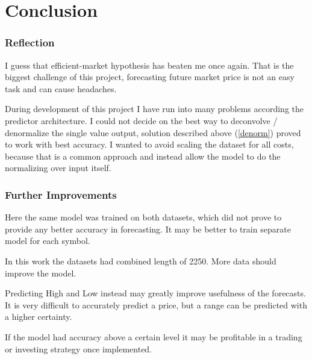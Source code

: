\documentclass[a4paper,12pt]{article}
\begin{document}

\part{Conclusion}
\section{Reflection}
I guess that efficient-market hypothesis has beaten me once again. That is the biggest challenge of this project, forecasting future market price is not an easy task and can cause headaches.

During development of this project I have run into many problems according the predictor architecture. I could not decide on the best way to deconvolve / denormalize the single value output, solution described above (\ref{denorm}) proved to work with best accuracy. I wanted to avoid scaling the dataset for all costs, because that is a common approach and instead allow the model to do the normalizing over input itself.

\section{Further Improvements}
Here the same model was trained on both datasets, which did not prove to provide any better accuracy in forecasting.
It may be better to train separate model for each symbol.

In this work the datasets had combined length of 2250. More data should improve the model.

Predicting High and Low instead may greatly improve usefulness of the forecasts. It is very difficult to accurately predict a price, but a range can be predicted with a higher certainty.

If the model had accuracy above a certain level it may be profitable in a trading or investing strategy once implemented.

\end{document}
